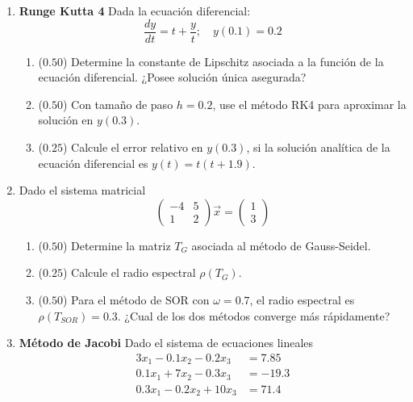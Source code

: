 \documentclass[12pt]{article}
\begin{document}
  \begin{enumerate}[leftmargin=*,widest=9]
    \item \textbf{Runge Kutta 4} Dada la ecuación diferencial:
    \[
    \frac{dy}{dt} = t + \frac{y}{t}; \quad y(0.1)=0.2
    \]
    \begin{enumerate}[label=\alph*]
    \item ($0.50$) Determine la constante de Lipschitz asociada a la función de la ecuación diferencial. ¿Posee solución única asegurada?
    \vspace{2cm}
    \item ($0.50$) Con tamaño de paso \(h=0.2\), use el método RK4 para aproximar la solución en \(y(0.3)\).
    \vspace{3cm}
    \item ($0.25$) Calcule el error relativo en \(y(0.3)\), si la solución analítica de la ecuación diferencial es \(y(t) = t(t+1.9)\).
    \vspace{2cm}
    \end{enumerate}
    \item Dado el sistema matricial
    \[
    \begin{pmatrix}
    -4 & 5 \\ 1 & 2
    \end{pmatrix} \vec{x} = \begin{pmatrix}
    1 \\ 3
    \end{pmatrix}
    \]
    \begin{enumerate}[label=\alph*]
    \item ($0.50$) Determine la matriz \(T_G\) asociada al método de Gauss-Seidel.
    \vspace{2cm}
    \item ($0.25$) Calcule el radio espectral \(\rho(T_G)\).
    \vspace{2cm}
    \item ($0.50$) Para el método de SOR con \(\omega=0.7\), el radio espectral es \(\rho(T_{SOR}) = 0.3\). ¿Cual de los dos métodos converge más rápidamente?
    \vspace{1cm}
    \end{enumerate}
    \item \textbf{Método de Jacobi} Dado el sistema de ecuaciones lineales
    \begin{align*}
    3x_1 - 0.1x_2 - 0.2x_3 & = 7.85 \\
    0.1x_1 + 7x_2 - 0.3x_3 & = -19.3 \\
    0.3x_1 - 0.2x_2 + 10x_3 & = 71.4

\end{align*}
\end{enumerate}
\end{document}
